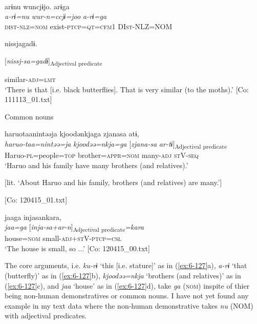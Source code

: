\begin{table}
\begin{styleBeschriftung}
      [Co: 111113\_01.txt]
\z

\ex{}\\
{\TM}
\glll  arɨnu  wuncjɨjo.  arɨga\\
\textit{a-rɨ=nu}  \textit{wur-n=ccjɨ=joo}  \textit{a-rɨ=ga}\\
\textsc{dist}-\textsc{nlz}=\textsc{nom}  exist-\textsc{ptcp}=\textsc{qt}=\textsc{cfm}1  DI\textsc{st}-NLZ=NOM

      nissjagadɨ.

      [\textit{nissj-sa=gadɨ}]\textsubscript{Adjectival predicate}

      similar-\textsc{adj}=\textsc{lmt}\\
\glt ‘There is that [i.e. black butterflies]. That is very similar (to the moths).’ [Co: 111113\_01.txt]
\z

  Common nouns

\ex {\TM}  haruotaanintəəja  kjoodənkjaga  zjanasa  atɨ,\\
\glll \textit{haruo-taa=nintəə=ja}  \textit{kjoodəə=nkja=ga}  [\textit{zjana-sa}  \textit{ar-tɨ}]\textsubscript{Adjectival predicate}\\
Haruo-\textsc{pl}=people=\textsc{top}  brother=\textsc{appr}=\textsc{nom}  many-\textsc{adj}  \textsc{st}V-\textsc{seq}\\
\glt ‘Haruo and his family have many brothers (and relatives).’

[lit. ‘About Haruo and his family, brothers (and relatives) are many.’]

      [Co: 120415\_01.txt]
\z

\ex {\TM}  jaaga  injasankara,\\
\glll \textit{jaa=ga}  [\textit{inja-sa+ar-n}]\textsubscript{Adjectival predicate}\textit{=kara}\\
house=\textsc{nom}  small-\textsc{adj}+\textsc{st}V-\textsc{ptcp}=\textsc{csl}\\
\glt ‘The house is small, so ...’ [Co: 120415\_00.txt]
\z

The core arguments, i.e. \textit{ku-rɨ} ‘this [i.e. stature]’ as in (\ref{ex:6-127}a), \textit{a-rɨ} ‘that (butterfly)’ as in (\ref{ex:6-127}b), \textit{kjoodəə=nkja} ‘brothers (and relatives)’ as in (\ref{ex:6-127}c), and \textit{jaa} ‘house’ as in (\ref{ex:6-127}d), take \textit{ga} (\textsc{nom}) inspite of thier being non-human demonstratives or common nouns. I have not yet found any example in my text data where the non-human demonstrative takes \textit{nu} (NOM) with adjectival predicates.


\end{styleBeschriftung}
\end{table}
